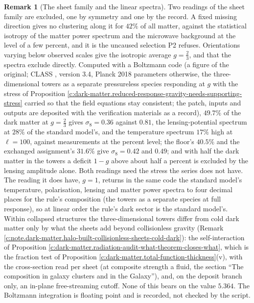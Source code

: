 \documentclass[11pt]{article}
\theoremstyle{definition}
\newtheorem{remark}[theorem]{Remark}
\theoremstyle{plain}
\begin{document}
\begin{remark}[The sheet family and the linear spectra]\label{c:note.dark-matter.sheet-family-linear-spectra}
Two readings of the sheet family are excluded, one by symmetry and one by the record. A fixed missing direction gives no clustering along it for $42\%$ of all matter, against the statistical isotropy of the matter power spectrum and the microwave background at the level of a few percent, and it is the uncaused selection P2 refuses. Orientations varying below observed scales give the isotropic average $g = \tfrac{2}{3}$, and that the spectra exclude directly. Computed with a Boltzmann code (a figure of the original; CLASS \cite{CLASS2011}, version 3.4, Planck 2018 parameters otherwise, the three-dimensional towers as a separate pressureless species responding at $g$ with the stress of Proposition \ref{c:dark-matter.reduced-response-gravity-needs-supporting-stress} carried so that the field equations stay consistent; the patch, inputs and outputs are deposited with the verification materials as a record), $49.7\%$ of the dark matter at $g = \tfrac{2}{3}$ gives $\sigma_{8} = 0.36$ against $0.81$, the lensing-potential spectrum at $28\%$ of the standard model's, and the temperature spectrum $17\%$ high at $\ell = 100$, against measurements at the percent level; the floor's $40.5\%$ and the exchanged assignment's $31.6\%$ give $\sigma_{8} = 0.42$ and $0.49$; and with half the dark matter in the towers a deficit $1 - g$ above about half a percent is excluded by the lensing amplitude alone. Both readings need the stress the series does not have. The reading it does have, $g = 1$, returns in the same code the standard model's temperature, polarisation, lensing and matter power spectra to four decimal places for the rule's composition (the towers as a separate species at full response), so at linear order the rule's dark sector is the standard model's. Within collapsed structures the three-dimensional towers differ from cold dark matter only by what the sheets add beyond collisionless gravity (Remark \ref{c:note.dark-matter.halo-built-collisionless-sheets-cold-dark}): the self-interaction of Proposition \ref{c:dark-matter.radiation-audit-what-theorem-closes-what}, which is the fraction test of Proposition \ref{c:dark-matter.total-function-thickness}(v), with the cross-section read per sheet (at composite strength a fluid, the section ``The composition in galaxy clusters and in the Galaxy''), and, on the deposit branch only, an in-plane free-streaming cutoff. None of this bears on the value $5.364$. The Boltzmann integration is floating point and is recorded, not checked by the script.
\end{remark}
\end{document}
